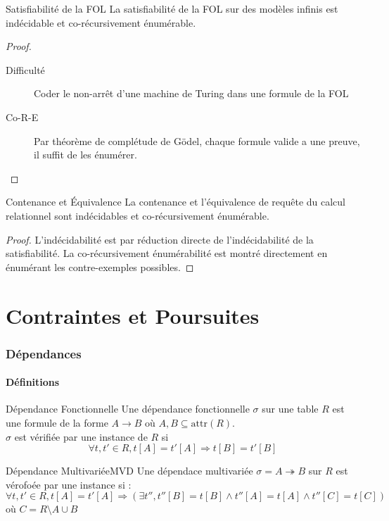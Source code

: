 \documentclass{cours}
\begin{document}
\begin{théorème}{Satisfiabilité de la FOL}{}
    La satisfiabilité de la FOL sur des modèles infinis est indécidable et co-récursivement énumérable. 
\end{théorème}
\begin{proof}
    \begin{description}
        \item[Difficulté] Coder le non-arrêt d'une machine de Turing dans une formule de la FOL
        \item[Co-R-E] Par théorème de complétude de Gödel, chaque formule valide a une preuve, il suffit de les énumérer.  
    \end{description}
\end{proof}

\begin{théorème}{Contenance et Équivalence}{}
    La contenance et l'équivalence de requête du calcul relationnel sont indécidables et co-récursivement énumérable. 
\end{théorème}
\begin{proof}
    L'indécidabilité est par réduction directe de l'indécidabilité de la satisfiabilité. La co-récursivement énumérabilité est montré directement en énumérant les contre-exemples possibles. 
\end{proof}


\part{Contraintes et Poursuites}
\section{Dépendances}
\subsection{Définitions}
\begin{définition}{Dépendance Fonctionnelle}{}
    Une dépendance fonctionnelle $\sigma$ sur une table $R$ est une formule de la forme $A \rightarrow B$ où $A, B \subseteq \mathrm{attr}(R)$.\\
    $\sigma$ est vérifiée par une instance de $R$ si 
    \[
        \forall t, t' \in R, t[A] = t'[A] \Longrightarrow t[B] = t'[B]
    \]
\end{définition}

\begin{définition}{Dépendance Multivariée}{MVD}
    Une dépendace multivariée $\sigma = A \twoheadrightarrow B$ sur $R$ est vérofoée par une instance si :
    \[
        \forall t, t' \in R, t[A] = t'[A] \Longrightarrow \left(\exists t'', t''[B] = t[B] \land t''[A] = t[A] \land t''[C] = t[C]\right)
    \]
    où $C = R \setminus A \cup B$
\end{définition}
\end{document}
